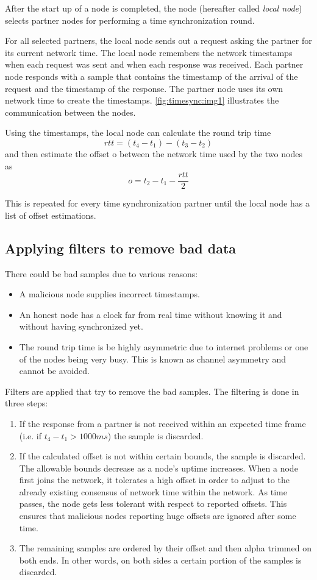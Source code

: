 After the start up of a node is completed, the node (hereafter called \emph{local node}) selects partner nodes for performing a time synchronization round.

For all selected partners, the local node sends out a request asking the partner for its current network time.
The local node remembers the network timestamps when each request was sent and when each response was received.
Each partner node responds with a sample that contains the timestamp of the arrival of the request and the timestamp of the response.
The partner node uses its own network time to create the timestamps.
\autoref{fig:timesync:img1} illustrates the communication between the nodes.



Using the timestamps, the local node can calculate the round trip time
$$\textit{rtt}=(t_4-t_1)-(t_3-t_2)$$
and then estimate the offset o between the network time used by the two nodes as
$$o = t_2-t_1-\frac{rtt}{2}$$

This is repeated for every time synchronization partner until the local node has a list of offset estimations.

\subsection{Applying filters to remove bad data}

There could be bad samples due to various reasons:
\begin{itemize}
\item A malicious node supplies incorrect timestamps.
\item An honest node has a clock far from real time without knowing it and without having synchronized yet.
\item The round trip time is be highly asymmetric due to internet problems or one of the nodes being very busy.
This is known as channel asymmetry and cannot be avoided.
\end{itemize}

Filters are applied that try to remove the bad samples. The filtering is done in three steps:
\begin{enumerate}
\item If the response from a partner is not received within an expected time frame (i.e. if $t_4-t_1 > 1000ms$) the sample is discarded.
\item If the calculated offset is not within certain bounds, the sample is discarded.
The allowable bounds decrease as a node's uptime increases.
When a node first joins the network, it tolerates a high offset in order to adjust to the already existing consensus of network time within the network.
As time passes, the node gets less tolerant with respect to reported offsets.
This ensures that malicious nodes reporting huge offsets are ignored after some time.
\item The remaining samples are ordered by their offset and then alpha trimmed on both ends.
In other words, on both sides a certain portion of the samples is discarded.
\end{enumerate}

